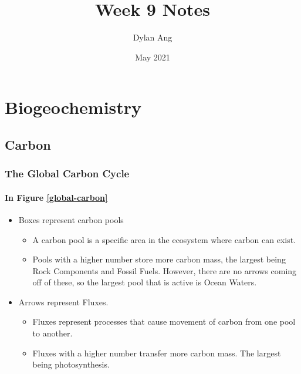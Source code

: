\documentclass[12pt]{article}
\title{Week 9 Notes}
\author{Dylan Ang}
\date{May 2021}
\begin{document}
\maketitle

\tableofcontents


\section{Biogeochemistry}

\subsection{Carbon}

\subsubsection{The Global Carbon Cycle}


\paragraph{In Figure \ref{global-carbon}}
\begin{itemize}
    \item Boxes represent carbon pools
          \begin{itemize}
              \item A carbon pool is a specific area in the ecosystem where carbon can exist.
              \item Pools with a higher number store more carbon mass, the largest being Rock Components and Fossil Fuels. However, there are no arrows coming off of these, so the largest pool that is active is Ocean Waters.
          \end{itemize}
    \item Arrows represent Fluxes.
          \begin{itemize}
              \item Fluxes represent processes that cause movement of carbon from one pool to another.
              \item Fluxes with a higher number transfer more carbon mass. The largest being photosynthesis.
          \end{itemize}
\end{itemize}
\end{document}
